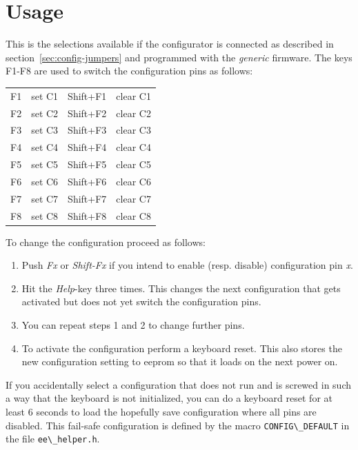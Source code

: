 \documentclass[DIV10]{scrartcl}
\begin{document}
\section{Usage}
This is the selections available if the configurator is connected as
described in section~\ref{sec:config-jumpers} and programmed with the
\emph{generic} firmware. The keys F1-F8 are used to switch the
configuration pins as follows:
\begin{center}
  \begin{tabular}{|l|l||l|l|}
    \hline
    F1 & set C1 & Shift+F1 & clear C1 \\
    F2 & set C2 & Shift+F2 & clear C2 \\
    F3 & set C3 & Shift+F3 & clear C3 \\
    F4 & set C4 & Shift+F4 & clear C4 \\
    F5 & set C5 & Shift+F5 & clear C5 \\
    F6 & set C6 & Shift+F6 & clear C6 \\
    F7 & set C7 & Shift+F7 & clear C7 \\
    F8 & set C8 & Shift+F8 & clear C8 \\
    \hline
  \end{tabular}
\end{center}
To change the configuration proceed as follows:
\begin{enumerate}
\item Push \emph{Fx} or \emph{Shift-Fx} if you intend to enable (resp. disable)
  configuration pin \emph{x}.
\item Hit the \emph{Help}-key three times. This changes the next
  configuration that gets activated but does not yet switch the
  configuration pins.
\item You can repeat steps 1 and 2 to change further pins.
\item To activate the configuration perform a keyboard reset. This
  also stores the new configuration setting to eeprom so that it loads
  on the next power on.
\end{enumerate}
  
If you accidentally select a configuration that does not run and is
screwed in such a way that the keyboard is not initialized, you can do
a keyboard reset for at least 6 seconds to load the hopefully save
configuration where all pins are disabled. This fail-safe
configuration is defined by the macro \verb!CONFIG\_DEFAULT! in the
file \verb#ee\_helper.h#.



\end{document}
